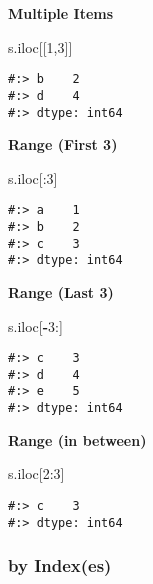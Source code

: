 \documentclass[
]{book}
\newenvironment{Shaded}{\begin{snugshade}}{\end{snugshade}}
\newcommand{\DecValTok}[1]{\textcolor[rgb]{0.06,0.06,0.06}{#1}}
\newcommand{\NormalTok}[1]{#1}
\newcommand{\OperatorTok}[1]{\textcolor[rgb]{0.43,0.43,0.43}{\textbf{#1}}}
\begin{document}
\textbf{Multiple Items}

\begin{Shaded}
\begin{Highlighting}[]
\NormalTok{s.iloc[[}\DecValTok{1}\NormalTok{,}\DecValTok{3}\NormalTok{]] }
\end{Highlighting}
\end{Shaded}

\begin{verbatim}
#:> b    2
#:> d    4
#:> dtype: int64
\end{verbatim}

\textbf{Range (First 3)}

\begin{Shaded}
\begin{Highlighting}[]
\NormalTok{s.iloc[:}\DecValTok{3}\NormalTok{]}
\end{Highlighting}
\end{Shaded}

\begin{verbatim}
#:> a    1
#:> b    2
#:> c    3
#:> dtype: int64
\end{verbatim}

\textbf{Range (Last 3)}

\begin{Shaded}
\begin{Highlighting}[]
\NormalTok{s.iloc[}\OperatorTok{{-}}\DecValTok{3}\NormalTok{:]}
\end{Highlighting}
\end{Shaded}

\begin{verbatim}
#:> c    3
#:> d    4
#:> e    5
#:> dtype: int64
\end{verbatim}

\textbf{Range (in between)}

\begin{Shaded}
\begin{Highlighting}[]
\NormalTok{s.iloc[}\DecValTok{2}\NormalTok{:}\DecValTok{3}\NormalTok{]}
\end{Highlighting}
\end{Shaded}

\begin{verbatim}
#:> c    3
#:> dtype: int64
\end{verbatim}

\hypertarget{by-indexes}{%
\subsubsection{by Index(es)}\label{by-indexes}}
\end{document}
